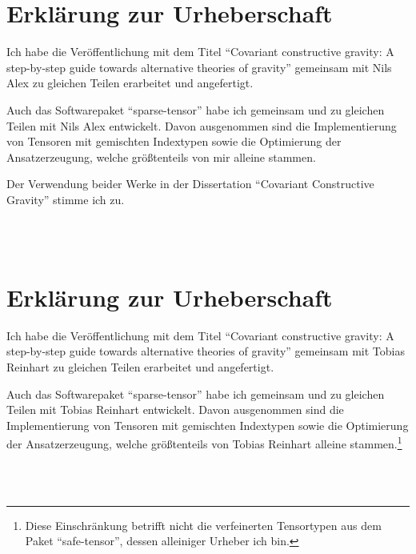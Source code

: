 \documentclass[%
ngerman,
12pt,
twoside=false,
headsepline,
numbers=noenddot,
parskip=half,
a4paper,
final
]{scrarticle}
\begin{document}
\section*{Erklärung zur Urheberschaft}

Ich habe die Veröffentlichung mit dem Titel \enquote{Covariant constructive gravity: A step-by-step guide towards alternative theories of gravity} \cite{Alex_2020} gemeinsam mit Nils Alex zu gleichen Teilen erarbeitet und angefertigt.

Auch das Softwarepaket \enquote{sparse-tensor} \cite{Reinhart_2019_sparse-tensor} habe ich gemeinsam und zu gleichen Teilen mit Nils Alex entwickelt. Davon ausgenommen sind die Implementierung von Tensoren mit gemischten Indextypen sowie die Optimierung der Ansatzerzeugung, welche größtenteils von mir alleine stammen.

Der Verwendung beider Werke in der Dissertation \enquote{Covariant Constructive Gravity} stimme ich zu.

\printbibliography[heading=none]

\vspace{1cm}

\begin{flushleft}
\makebox[.4\textwidth]{\hrulefill}\hfill \makebox[.4\textwidth]{\hrulefill}\\
\hfill
{}\\
\end{flushleft}

\newpage
\section*{Erklärung zur Urheberschaft}

Ich habe die Veröffentlichung mit dem Titel \enquote{Covariant constructive gravity: A step-by-step guide towards alternative theories of gravity} \cite{Alex_2020} gemeinsam mit Tobias Reinhart zu gleichen Teilen erarbeitet und angefertigt.

Auch das Softwarepaket \enquote{sparse-tensor} \cite{Reinhart_2019_sparse-tensor} habe ich gemeinsam und zu gleichen Teilen mit Tobias Reinhart entwickelt. Davon ausgenommen sind die Implementierung von Tensoren mit gemischten Indextypen sowie die Optimierung der Ansatzerzeugung, welche größtenteils von Tobias Reinhart alleine stammen.\footnote{Diese Einschränkung betrifft nicht die verfeinerten Tensortypen aus dem Paket \enquote{safe-tensor}, dessen alleiniger Urheber ich bin.}

\printbibliography[heading=none]

\vspace{1cm}

\begin{flushleft}
\makebox[.4\textwidth]{\hrulefill}\hfill \makebox[.4\textwidth]{\hrulefill}\\
\hfill
{}\\
\end{flushleft}
\end{document}
